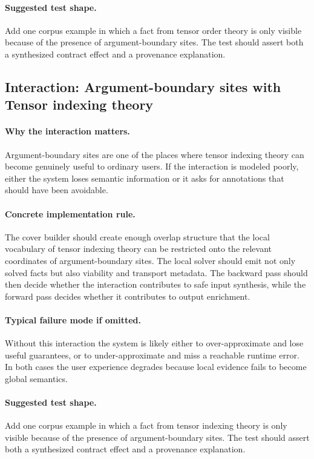 \documentclass[11pt]{report}
\theoremstyle{definition}
\theoremstyle{plain}
\begin{document}
\paragraph{Suggested test shape.}
Add one corpus example in which a fact from tensor order theory is only
visible because of the presence of argument-boundary sites. The test should
assert both a synthesized contract effect and a provenance explanation.

\subsection{Interaction: Argument-boundary sites with Tensor indexing theory}

\paragraph{Why the interaction matters.}
Argument-boundary sites are one of the places where tensor indexing theory can become
genuinely useful to ordinary users. If the interaction is modeled poorly,
either the system loses semantic information or it asks for annotations that
should have been avoidable.

\paragraph{Concrete implementation rule.}
The cover builder should create enough overlap structure that the local
vocabulary of tensor indexing theory can be restricted onto the relevant
coordinates of argument-boundary sites. The local solver should emit not only
solved facts but also viability and transport metadata. The backward pass
should then decide whether the interaction contributes to safe input
synthesis, while the forward pass decides whether it contributes to output
enrichment.

\paragraph{Typical failure mode if omitted.}
Without this interaction the system is likely either to over-approximate and
lose useful guarantees, or to under-approximate and miss a reachable runtime
error. In both cases the user experience degrades because local evidence
fails to become global semantics.

\paragraph{Suggested test shape.}
Add one corpus example in which a fact from tensor indexing theory is only
visible because of the presence of argument-boundary sites. The test should
assert both a synthesized contract effect and a provenance explanation.
\end{document}
